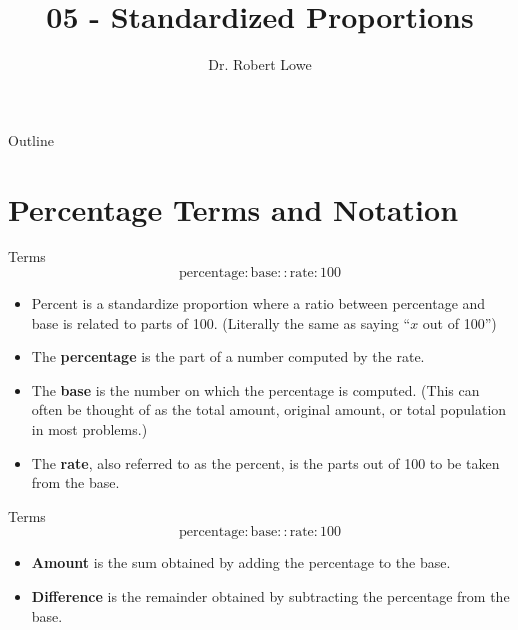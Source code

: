 \documentclass[]{beamer}
\title{05 - Standardized Proportions}
\author{Dr. Robert Lowe\\}
\institute[Maryville College] %
{
  Division of Mathematics and Computer Science\\
  Maryville College
}
\date[]{}
\begin{document}
\begin{frame}
  \titlepage
\end{frame}

\begin{frame}{Outline}
  \tableofcontents
\end{frame}




\section{Percentage Terms and Notation}

\begin{frame}{Terms}
\[
\mathrm{percentage} : \mathrm{base} :: \mathrm{rate} : 100
\]
\begin{itemize}[<+->]
    \item Percent is a standardize proportion where a ratio between percentage and base is related to parts of 100. (Literally the same as saying ``$x$ out of 100'')
    \item The {\bf percentage} is the part of a number computed by the rate.
    \item The {\bf base} is the number on which the percentage is computed.  (This can often be thought of as the total amount, original amount, or total population in most problems.)
    \item The {\bf rate}, also referred to as the percent, is the parts out of 100 to be taken from the base. 
\end{itemize}
\end{frame}

\begin{frame}{Terms}
\[
\mathrm{percentage} : \mathrm{base} :: \mathrm{rate} : 100
\]
\begin{itemize}[<+->]
    \item {\bf Amount} is the sum obtained by adding the percentage to the base.
    \item {\bf Difference} is the remainder obtained by subtracting the percentage from the base.
\end{itemize}
\end{frame}
\end{document}

